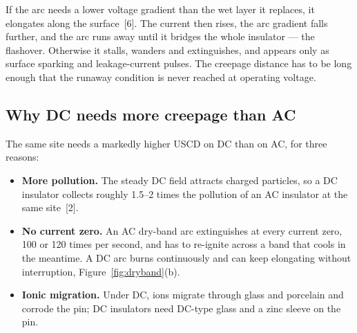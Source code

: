 If the arc needs a lower voltage gradient than the wet layer it replaces, it
elongates along the surface~[6]. The current then rises, the arc gradient
falls further, and the arc runs away until it bridges the whole insulator ---
the flashover. Otherwise it stalls, wanders and extinguishes, and appears
only as surface sparking and leakage-current pulses. The creepage distance
has to be long enough that the runaway condition is never reached at
operating voltage.

\subsection{Why DC needs more creepage than AC}
\label{sec:creepage-dc}

The same site needs a markedly higher USCD on DC than on AC, for three
reasons:

\begin{itemize}[itemsep=0.2em]
  \item \textbf{More pollution.} The steady DC field attracts charged
        particles, so a DC insulator collects roughly 1.5--2 times the
        pollution of an AC insulator at the same site~[2].
  \item \textbf{No current zero.} An AC dry-band arc extinguishes at every
        current zero, 100 or 120 times per second, and has to re-ignite across
        a band that cools in the meantime. A DC arc burns continuously and can
        keep elongating without interruption, Figure~\ref{fig:dryband}(b).
  \item \textbf{Ionic migration.} Under DC, ions migrate through glass and
        porcelain and corrode the pin; DC insulators need DC-type glass and a
        zinc sleeve on the pin.
\end{itemize}

